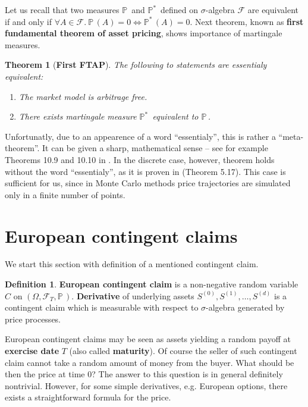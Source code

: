 \documentclass[a4paper,11pt, twoside]{book}
\newtheorem{thm}{Theorem}[chapter]
\theoremstyle{definition}
\newtheorem{mydef}{Definition}[chapter]
\theoremstyle{remark}
\def\P{{\mathbb{P}}\,}
\def\Pm{{\mathbb{P}}^*\,}
\begin{document}
Let us recall that two measures $\P$ and $\Pm$ defined on $\sigma$-algebra $\mathcal{F}$ are equivalent if and only if $\forall A \in \mathcal{F}.\ \P(A)=0 \Leftrightarrow \Pm(A)=0$. Next theorem, known as \textbf{first fundamental theorem of asset pricing}, shows importance of martingale measures.
\begin{thm}[\bfseries First FTAP]
 \label{thm:fftap}
 The following to statements are \emph{essentialy} equivalent:
 \begin{enumerate}
  \item The market model is arbitrage free.
  \item There exists martingale measure $\Pm$ equivalent to $\P$.
 \end{enumerate}
\end{thm}
Unfortunatly, due to an appearence of a word ``essentialy'', this is rather a ``meta-theorem''. It can be given a sharp, mathematical sense -- see for example Theorems 10.9 and 10.10 in \cite{bjork}. In the discrete case, however, theorem holds without the word ``essentialy'', as it is proven in \cite{follmer} (Theorem 5.17). This case is sufficient for us, since in Monte Carlo methods price trajectories are simulated only in a finite number of points.

\section{European contingent claims}
\label{sec:ECC}
We start this section with definition of a mentioned contingent claim.
\begin{mydef}
 \label{def:cc_eu}
 \textbf{European contingent claim} is a non-negative random variable $C$ on $(\Omega, \mathcal{F}_T, \P)$. \textbf{Derivative} of underlying assets $S^{(0)}, S^{(1)}, \ldots, S^{(d)}$ is a contingent claim which is measurable with respect to $\sigma$-algebra generated by price processes.
\end{mydef}
European contingent claims may be seen as assets yielding a random payoff at \textbf{exercise date} $T$ (also called \textbf{maturity}). Of course the seller of such contingent claim cannot take a random amount of money from the buyer. What should be then the price at time $0$? The answer to this question is in general definitely nontrivial. However, for some simple derivatives, e.g. European options, there exists a straightforward formula for the price.
\end{document}
